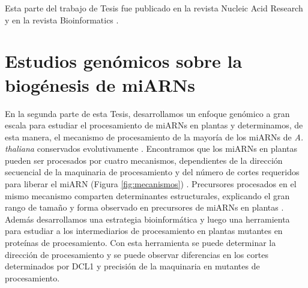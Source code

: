 Esta parte del trabajo de Tesis fue publicado en la revista Nucleic Acid Research \citep{Chorostecki05072012} y en la revista Bioinformatics \citep{Chorostecki2014}.



\section{Estudios genómicos sobre la biogénesis de miARNs}

En la segunda parte de esta Tesis, desarrollamos un enfoque genómico a gran escala para estudiar el procesamiento de miARNs en plantas y determinamos, de esta manera, el mecanismo de procesamiento de la mayoría de los miARNs de \textit{A. thaliana} conservados evolutivamente \citep{Bologna2013}.
Encontramos que los miARNs en plantas pueden ser procesados por cuatro mecanismos, dependientes de la dirección secuencial de la maquinaria de procesamiento y del número de cortes requeridos para liberar el miARN (Figura \ref{fig:mecanismos}) \citep{Bologna2013}.
Precursores procesados en el mismo mecanismo comparten determinantes estructurales, explicando el gran rango de tamaño y forma observado en precursores de miARNs en plantas \citep{Bologna2013}.
Además desarrollamos una estrategia bioinformática y luego una herramienta para estudiar a los intermediarios de procesamiento en plantas mutantes en proteínas de procesamiento.
Con esta herramienta se puede determinar la dirección de procesamiento y se puede observar diferencias en los cortes determinados por DCL1 y precisión de la maquinaria en mutantes de procesamiento.


